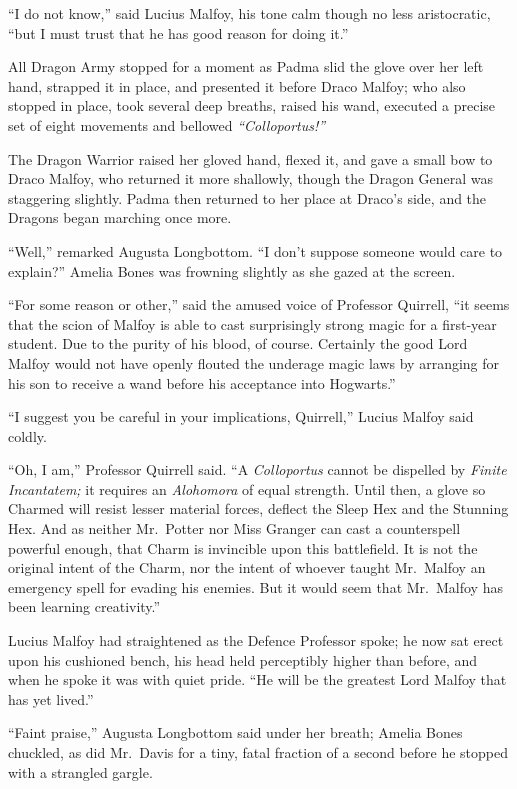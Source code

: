 ``I do not know,'' said Lucius Malfoy, his tone calm though no less
aristocratic, ``but I must trust that he has good reason for doing it.''

All Dragon Army stopped for a moment as Padma slid the glove over her
left hand, strapped it in place, and presented it before Draco Malfoy;
who also stopped in place, took several deep breaths, raised his wand,
executed a precise set of eight movements and bellowed
\emph{``Colloportus!''}

The Dragon Warrior raised her gloved hand, flexed it, and gave a small
bow to Draco Malfoy, who returned it more shallowly, though the Dragon
General was staggering slightly. Padma then returned to her place at
Draco's side, and the Dragons began marching once more.

``Well,'' remarked Augusta Longbottom. ``I don't suppose someone would
care to explain?'' Amelia Bones was frowning slightly as she gazed at
the screen.

``For some reason or other,'' said the amused voice of Professor
Quirrell, ``it seems that the scion of Malfoy is able to cast
surprisingly strong magic for a first-year student. Due to the purity of
his blood, of course. Certainly the good Lord Malfoy would not have
openly flouted the underage magic laws by arranging for his son to
receive a wand before his acceptance into Hogwarts.''

``I suggest you be careful in your implications, Quirrell,'' Lucius
Malfoy said coldly.

``Oh, I am,'' Professor Quirrell said. ``A \emph{Colloportus} cannot be
dispelled by \emph{Finite Incantatem;} it requires an \emph{Alohomora}
of equal strength. Until then, a glove so Charmed will resist lesser
material forces, deflect the Sleep Hex and the Stunning Hex. And as
neither Mr.~Potter nor Miss Granger can cast a counterspell powerful
enough, that Charm is invincible upon this battlefield. It is not the
original intent of the Charm, nor the intent of whoever taught
Mr.~Malfoy an emergency spell for evading his enemies. But it would seem
that Mr.~Malfoy has been learning creativity.''

Lucius Malfoy had straightened as the Defence Professor spoke; he now
sat erect upon his cushioned bench, his head held perceptibly higher
than before, and when he spoke it was with quiet pride. ``He will be the
greatest Lord Malfoy that has yet lived.''

``Faint praise,'' Augusta Longbottom said under her breath; Amelia Bones
chuckled, as did Mr.~Davis for a tiny, fatal fraction of a second before
he stopped with a strangled gargle.

